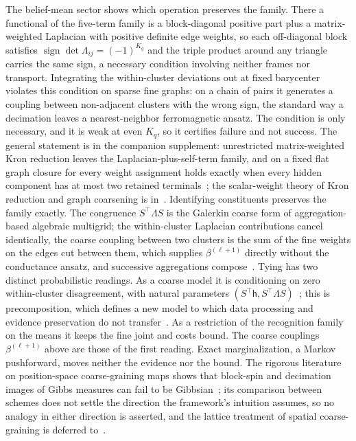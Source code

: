 \documentclass[11pt]{article}
\begin{document}
The belief-mean sector shows which operation preserves the family. There a functional of the five-term family is a block-diagonal positive part plus a matrix-weighted Laplacian with positive definite edge weights, so each off-diagonal block satisfies $\operatorname{sign}\det\Lambda_{ij} = (-1)^{K_q}$ and the triple product around any triangle carries the same sign, a necessary condition involving neither frames nor transport. Integrating the within-cluster deviations out at fixed barycenter violates this condition on sparse fine graphs: on a chain of pairs it generates a coupling between non-adjacent clusters with the wrong sign, the standard way a decimation leaves a nearest-neighbor ferromagnetic ansatz. The condition is only necessary, and it is weak at even $K_q$, so it certifies failure and not success. The general statement is in the companion supplement: unrestricted matrix-weighted Kron reduction leaves the Laplacian-plus-self-term family, and on a fixed flat graph closure for every weight assignment holds exactly when every hidden component has at most two retained terminals~\cite[Ch.~G7]{DennisGaugeVFESuppG2026}; the scalar-weight theory of Kron reduction and graph coarsening is in~\cite{DorflerBullo2013Kron, Loukas2019, villegas2023laplacian}. Identifying constituents preserves the family exactly. The congruence $S^\top\Lambda S$ is the Galerkin coarse form of aggregation-based algebraic multigrid; the within-cluster Laplacian contributions cancel identically, the coarse coupling between two clusters is the sum of the fine weights on the edges cut between them, which supplies $\beta^{(\ell+1)}$ directly without the conductance ansatz, and successive aggregations compose~\cite[Ch.~G9]{DennisGaugeVFESuppG2026}. Tying has two distinct probabilistic readings. As a coarse model it is conditioning on zero within-cluster disagreement, with natural parameters $(S^\top \mathsf{h}, S^\top\Lambda S)$~\cite[Ch.~G7]{DennisGaugeVFESuppG2026}; this is precomposition, which defines a new model to which data processing and evidence preservation do not transfer~\cite[Ch.~9]{DennisGaugeVFE2026}. As a restriction of the recognition family on the means it keeps the fine joint and costs bound. The coarse couplings $\beta^{(\ell+1)}$ above are those of the first reading. Exact marginalization, a Markov pushforward, moves neither the evidence nor the bound. The rigorous literature on position-space coarse-graining maps shows that block-spin and decimation images of Gibbs measures can fail to be Gibbsian~\cite{VanEnterFernandezSokal1993}; its comparison between schemes does not settle the direction the framework's intuition assumes, so no analogy in either direction is asserted, and the lattice treatment of spatial coarse-graining is deferred to~\cite[Chs.~B7--B9]{DennisGaugeVFESuppB2026}.
\end{document}
